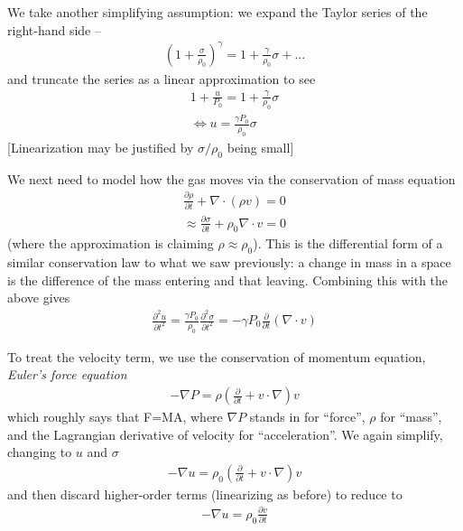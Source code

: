 \documentclass{article}
\newcommand{\pd}{\partial}
\begin{document}
	We take another simplifying assumption: we expand the Taylor series of the right-hand side -- 
	\begin{align*}
		\left( 1 + \frac{\sigma}{\rho_0} \right)^{\gamma} = 1 + \frac{\gamma}{\rho_0} \sigma + ...
	\end{align*}
	and truncate the series as a linear approximation to see
	\begin{align*}
		1 + \frac{u}{P_0} = 1 +  \frac{\gamma}{\rho_0} \sigma \\
		\Leftrightarrow u = \frac{\gamma P_0}{\rho_0} \sigma
	\end{align*}
	[Linearization may be justified by $\sigma/\rho_0$ being small]
	
	We next need to model how the gas moves via the conservation of mass equation
	\begin{align*}
		\frac{\pd \rho}{\pd t} + \nabla \cdot( \rho v) = 0 \\
		\approx \frac{\pd \sigma}{\pd t} + \rho_0 \nabla \cdot v = 0
	\end{align*}
	(where the approximation is claiming $\rho \approx \rho_0$). This is the differential form of a similar conservation law to what we saw previously: a change in mass in a space is the difference of the mass entering and that leaving. Combining this with the above gives
	\begin{align*}
		\frac{\pd^{2} u}{\pd t^{2}} =  \frac{\gamma P_0}{\rho_0}\frac{\pd^{2} \sigma}{\pd t^{2}}=  -\gamma P_0 \frac{\pd}{\pd t} (\nabla \cdot v)
	\end{align*}
	
	
	
	To treat the velocity term, we use the conservation of momentum equation, \textit{Euler's force equation}
	\begin{align*}
		-\nabla P = \rho \left(\frac{\pd}{\pd t} + v \cdot \nabla  \right)v
	\end{align*}
	which roughly says that F=MA, where $\nabla P$ stands in for ``force'', $\rho$ for ``mass'', and the Lagrangian derivative of velocity for ``acceleration''. We again simplify, changing to $u$ and $\sigma$
	\begin{align*}
		- \nabla u = \rho_0 \left(\frac{\pd}{\pd t} + v \cdot \nabla \right)v
	\end{align*} 
	and then discard higher-order terms (linearizing as before) to reduce to 
	\begin{align*}
		- \nabla u = \rho_0 \frac{\pd v}{\pd t}
	\end{align*}
	
\end{document}
